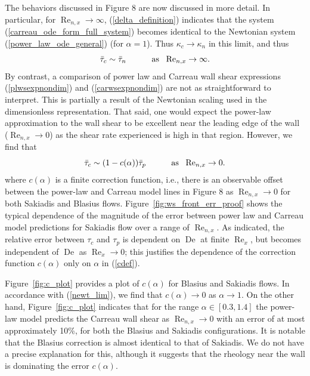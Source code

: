 \documentclass{article}
\begin{document}
The behaviors discussed in Figure 8 are now discussed in more detail. In particular,  for $\operatorname{Re}_{n,x} \to \infty $, (\ref{delta_definition}) indicates that the system (\ref{carreau_ode_form_full_system}) becomes identical to the Newtonian system (\ref{power_law_ode_general}) (for $\alpha=1$).  Thus $\kappa_c \to \kappa_n$ in this limit, and thus\begin{equation}
    \bar{\tau}_c \sim \bar{\tau}_n \hphantom{\sum\sum} \mathrm{as}~~\operatorname{Re}_{n, x} \to \infty. \label{newt_lim}  
\end{equation} By contrast, a comparison of power law and Carreau wall shear expressions (\ref{plwsexpnondim}) and (\ref{carwsexpnondim}) are not as straightforward to interpret. This is partially a result of the Newtonian scaling used in the dimensionless representation.  That said, one would expect the power-law approximation to the wall shear to be excellent near the leading edge of the wall ($\operatorname{Re}_{n, x} \to 0$) as the shear rate experienced is high in that region.  However, we find that \begin{equation}
    \bar{\tau}_c \sim (1 - c(\alpha)) \bar{\tau}_p \hphantom{\sum\sum} \mathrm{as}~~\operatorname{Re}_{n, x} \to 0. \label{cdef}
\end{equation} where $c(\alpha)$ is a finite correction function, i.e., there is an observable offset between the power-law and Carreau model lines in Figure 8 as $\operatorname{Re}_{n, x} \to 0$  for both Sakiadis and Blasius flows.  Figure~\ref{fig:ws_front_err_proof} shows the typical dependence of the magnitude of the error between power law and Carreau model predictions for Sakiadis flow over a range of $\operatorname{Re}_{n, x}$. As indicated, the relative error between $\tau_c$ and $\tau_p$ is dependent on $\operatorname{De}$ at finite $\operatorname{Re}_x$, but becomes independent of $\operatorname{De}$ as $\operatorname{Re}_x \to 0$; this justifies the dependence of the correction function $c(\alpha)$ only on $\alpha$ in (\ref{cdef}). 

Figure~\ref{fig:c_plot} provides a plot of $c(\alpha)$ for Blasius and Sakiadis flows. In accordance with (\ref{newt_lim}), we find that $c(\alpha) \to 0$ as $\alpha \to 1$.  On the other hand, Figure~\ref{fig:c_plot} indicates that for the range $\alpha \in [0.3, 1.4]$ the power-law model predicts the Carreau wall shear as $\operatorname{Re}_{n, x} \to 0$ with an error of at most approximately 10\%, for both the Blasius and Sakiadis configurations. It is notable that the Blasius correction is almost identical to that of Sakiadis. We do not have a precise explanation for this, although it suggests that the rheology near the wall is dominating the error $c(\alpha)$.
\end{document}
